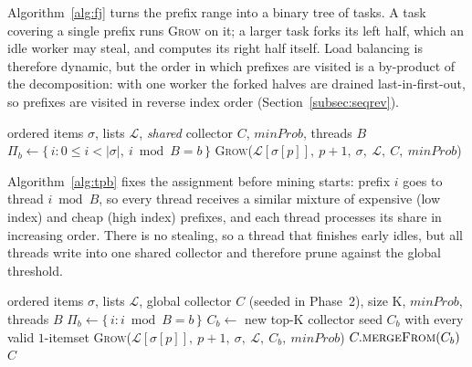 \documentclass[pdflatex,sn-vancouver-num]{sn-jnl}
\theoremstyle{thmstyleone}%
\theoremstyle{thmstyletwo}%
\theoremstyle{thmstylethree}%
\newcommand{\minprob}{\mathit{minProb}}
\newcommand{\Kk}{\mathrm{K}}
\begin{document}
Algorithm~\ref{alg:fj} turns the prefix range into a binary tree of
tasks. A task covering a single prefix runs \textsc{Grow} on it; a larger
task forks its left half, which an idle worker may steal, and computes its
right half itself. Load balancing is therefore dynamic, but the order in
which prefixes are visited is a by-product of the decomposition: with one
worker the forked halves are drained last-in-first-out, so prefixes are
visited in reverse index order (Section~\ref{subsec:seqrev}).

\begin{algorithm}[t]
\caption{\textsc{ThreadPoolMine} (TPB): static round-robin, shared threshold}\label{alg:tpb}
\begin{algorithmic}[1]
\Require ordered items $\sigma$, lists $\mathcal{L}$, \emph{shared} collector $C$, $\minprob$, threads $B$
 $\Pi_b \gets \{\,i : 0\le i<|\sigma|,\ i \bmod B = b\,\}$ \EndFor
{}
     \State \textsc{Grow}($\mathcal{L}[\sigma[p]],\ p{+}1,\ \sigma,\ \mathcal{L},\ C,\ \minprob$)
  \EndFor
\EndFor
\end{algorithmic}
\end{algorithm}

Algorithm~\ref{alg:tpb} fixes the assignment before mining starts:
prefix $i$ goes to thread $i \bmod B$, so every thread receives a similar
mixture of expensive (low index) and cheap (high index) prefixes, and each
thread processes its share in increasing order. There is no stealing, so a
thread that finishes early idles, but all threads write into one shared
collector and therefore prune against the global threshold.

\begin{algorithm}[t]
\caption{\textsc{PartitionLocalMerge} (PLM): the same distribution as TPB, without threshold sharing}\label{alg:plm}
\begin{algorithmic}[1]
\Require ordered items $\sigma$, lists $\mathcal{L}$, global collector $C$ (seeded in Phase~2), size $\Kk$, $\minprob$, threads $B$
 $\Pi_b \gets \{\,i : i \bmod B = b\,\}$ \EndFor {}
  \State $C_b \gets$ new top-$\Kk$ collector
  \State seed $C_b$ with every valid $1$-itemset 
\EndFor
{}
     \State \textsc{Grow}($\mathcal{L}[\sigma[p]],\ p{+}1,\ \sigma,\ \mathcal{L},\ C_b,\ \minprob$)
  \EndFor
\EndFor
{} $C.\textsc{mergeFrom}(C_b)$  \EndFor
\State \Return $C$
\end{algorithmic}
\end{algorithm}
\end{document}
